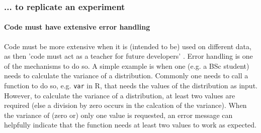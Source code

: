 \subsubsection{... to replicate an experiment}

\paragraph{Code must have extensive error handling}

Code must be more extensive when it is (intended to be) 
used on different data,
as then 'code must act as a teacher for future developers' \cite{sadowski2018modern}.
Error handling is one of the mechanisms to do so.
A simple example is when one (e.g. a BSc student) 
needs to calculate the variance of a distribution.
Commonly one needs to call a function to do so, 
e.g. \verb|var| in R, that needs the values of the distribution
as input.
However, to calculate the variance of a distribution, at least two values
are required (else a division by zero occurs in the calcation of the variance). 
When the variance of (zero or) only one value is requested,
an error message can helpfully indicate that the function 
needs at least two values to work as expected.

